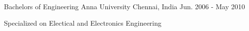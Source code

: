
\begin{cventries}

  \cventry
  {Bachelors of Engineering} %
  {Anna University} %
  {Chennai, India} %
  {Jun. 2006 - May 2010} %
  {
    \begin{cvitems} %
    \item {Specialized on Electical and Electronics Engineering}
      \end{cvitems}
  }
\end{cventries}
